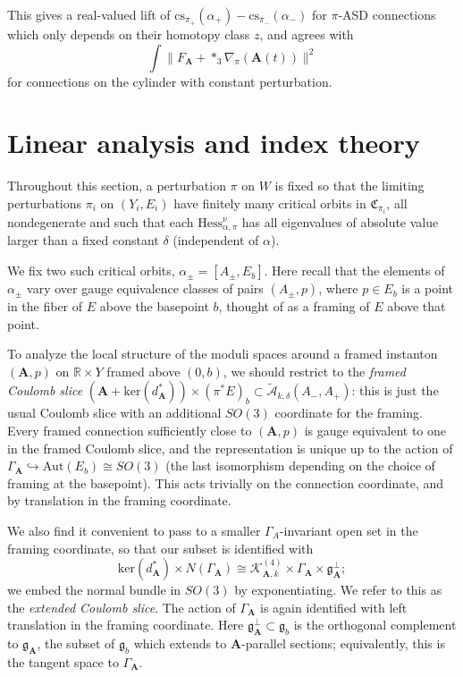 \documentclass[10pt,a4paper]{amsart}
\newcommand{\pE}{\pi^* \! E}
\theoremstyle{definition}
\theoremstyle{remark}
\numberwithin{figure}{qchap}
\begin{document}
This gives a real-valued lift of $\text{cs}_{\pi_+}(\alpha_+) - \text{cs}_{\pi_-}(\alpha_-)$ for $\pi$-ASD connections which only depends on their homotopy class $z$, and agrees with
$$\int \|F_{\mathbf{A}} + *_3\nabla_\pi(\mathbf{A}(t))\|^2$$
for connections on the cylinder with constant perturbation.

\section{Linear analysis and index theory}\label{sec:4d-linear}
Throughout this section, a perturbation $\pi$ on $W$ is fixed so that the limiting perturbations $\pi_i$ on $(Y_i,E_i)$ have finitely many critical orbits in $\mathfrak C_{\pi_i}$, all nondegenerate and such that each $\text{Hess}^\nu_{\alpha, \pi}$ has all eigenvalues of absolute value larger than a fixed constant $\delta$ (independent of $\alpha$).

We fix two such critical orbits, $\alpha_\pm = [A_\pm, E_b]$. Here recall that the elements of $\alpha_\pm$ vary over gauge equivalence classes of pairs $(A_\pm, p)$, where $p \in E_b$ is a point in the fiber of $E$ above the basepoint $b$, thought of as a framing of $E$ above that point.

To analyze the local structure of the moduli spaces around a framed instanton $(\mathbf{A},p)$ on $\mathbb R \times Y$ framed above $(0,b)$, we should restrict to the \textit{framed Coulomb slice} $\left(\mathbf{A}+\text{ker}(d_\mathbf{A}^*)\right) \times (\pE)_b \subset \widetilde{\mathcal A}_{k,\delta}(A_-, A_+)$: this is just the usual Coulomb slice with an additional $SO(3)$ coordinate for the framing. Every framed connection sufficiently close to $(\mathbf{A},p)$ is gauge equivalent to one in the framed Coulomb slice, and the representation is unique up to the action of $\Gamma_{\mathbf{A}} \hookrightarrow \text{Aut}(E_b) \cong SO(3)$ (the last isomorphism depending on the choice of framing at the basepoint). This acts trivially on the connection coordinate, and by translation in the framing coordinate.

We also find it convenient to pass to a smaller $\Gamma_A$-invariant open set in the framing coordinate, so that our subset is identified with 
\begin{equation}\label{eCoulomb}\text{ker}(d_{\mathbf{A}}^*) \times N(\Gamma_{\mathbf{A}}) \cong \mathcal K^{(4)}_{\mathbf{A},k} \times \Gamma_{\mathbf{A}} \times \mathfrak g_\mathbf{A}^\perp;\end{equation} 
we embed the normal bundle in $SO(3)$ by exponentiating. We refer to this as the \textit{extended Coulomb slice}. The action of $\Gamma_{\mathbf{A}}$ is again identified with left translation in the framing coordinate. Here $\mathfrak g_{\mathbf{A}}^\perp \subset \mathfrak g_b$ is the orthogonal complement to $\mathfrak g_{\mathbf{A}}$, the subset of $\mathfrak g_b$ which extends to $\mathbf{A}$-parallel sections; equivalently, this is the tangent space to $\Gamma_{\mathbf{A}}$. 
\end{document}
